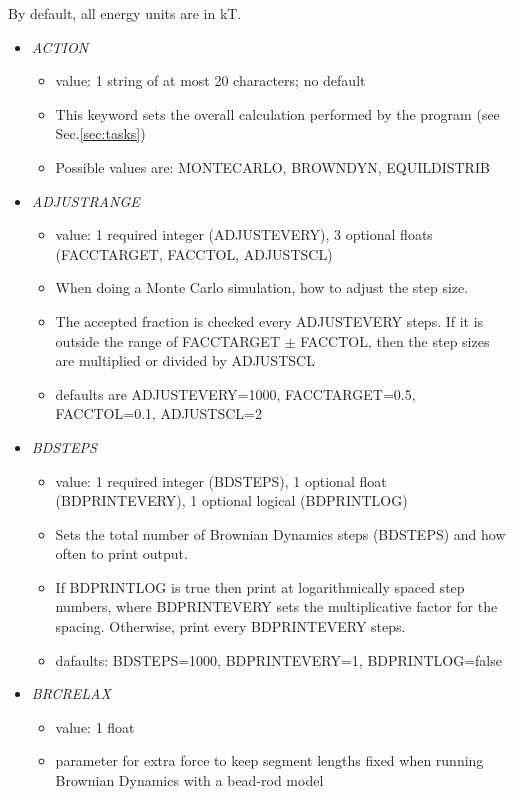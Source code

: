 \documentclass[12pt]{article}
\begin{document}
By default, all energy units are in kT. 

\begin{itemize}
%
\item {\it ACTION}
  \begin{itemize}
    \item  value: 1 string of at most 20 characters; no default
    \item This keyword sets the overall calculation performed by the program
 (see Sec.\ref{sec:tasks})
    \item Possible values are: MONTECARLO, BROWNDYN, EQUILDISTRIB
  \end{itemize}
%
\item {\it ADJUSTRANGE}
  \begin{itemize}
    \item  value: 1 required integer (ADJUSTEVERY), 3 optional floats (FACCTARGET, FACCTOL, ADJUSTSCL)
    \item When doing a Monte Carlo simulation, how to adjust the step size.
    \item The accepted fraction is checked every ADJUSTEVERY steps. If it is outside the range of FACCTARGET $\pm$ FACCTOL, then the step sizes are multiplied or divided by ADJUSTSCL
    \item defaults are ADJUSTEVERY=1000, FACCTARGET=0.5, FACCTOL=0.1, ADJUSTSCL=2
  \end{itemize}
%
\item {\it BDSTEPS}
  \begin{itemize}
    \item  value: 1 required integer (BDSTEPS), 1 optional float (BDPRINTEVERY), 1 optional logical (BDPRINTLOG)
    \item Sets the total number of Brownian Dynamics steps (BDSTEPS) and how often to print output.
    \item If BDPRINTLOG is true then print at logarithmically spaced step numbers, where BDPRINTEVERY sets the multiplicative factor for the spacing. Otherwise, print every BDPRINTEVERY steps.
    \item dafaults: BDSTEPS=1000, BDPRINTEVERY=1, BDPRINTLOG=false
  \end{itemize}
%
\item {\it BRCRELAX}
  \begin{itemize}
    \item  value: 1 float
    \item parameter for extra force to keep segment lengths fixed when running Brownian Dynamics with a bead-rod model

\end{itemize}
\end{itemize}
\end{document}
